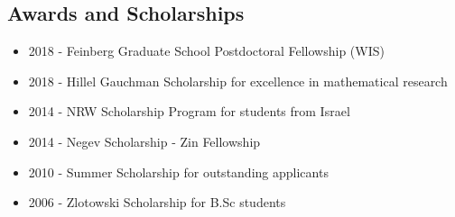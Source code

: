 \documentclass[leqno,10pt]{article}
\begin{document}
\iffalse
\subsection*{General Talks}
\begin{itemize}
\item July 2017 - Young algebra day, student seminar at the Weizmann Institute of Science

\textsc{Topic}- \textit{On regular representations of groups}.
\item July 2017 - Desert Excavations \textit{"Hafirot BaMidbar"} student seminar in mathematics, Ben Gurion University

\textsc{Topic} - \textit{Counting representations of groups}.
\item April 2017 - Window to mathematics seminar \textit{"Eshnav LeMathematica"}, Ben Gurion University

\textsc{Topic}- \textit{On the $p$-adic Numbers and Their Applications to Counting Problems}
\end{itemize}
\fi
\subsection*{Awards and Scholarships}
\begin{itemize}
\item 2018 - Feinberg Graduate School Postdoctoral Fellowship (WIS)
\item 2018 - Hillel Gauchman Scholarship for excellence in mathematical research
\item 2014 - NRW Scholarship Program for students from Israel
\item 2014 - Negev Scholarship - Zin Fellowship
\item 2010 - Summer Scholarship for outstanding applicants
\item 2006 - Zlotowski Scholarship for B.Sc students
\end{itemize}
\end{document}
